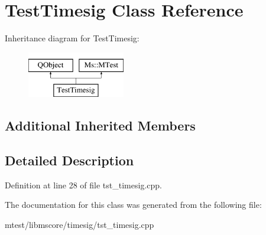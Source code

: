 \hypertarget{class_test_timesig}{}\section{Test\+Timesig Class Reference}
\label{class_test_timesig}
Inheritance diagram for Test\+Timesig\+:\begin{figure}[H]
\begin{center}
\leavevmode
\includegraphics[height=2.000000cm]{class_test_timesig}
\end{center}
\end{figure}
\subsection*{Additional Inherited Members}


\subsection{Detailed Description}


Definition at line 28 of file tst\+\_\+timesig.\+cpp.



The documentation for this class was generated from the following file\+:\begin{DoxyCompactItemize}
\item 
mtest/libmscore/timesig/tst\+\_\+timesig.\+cpp\end{DoxyCompactItemize}

